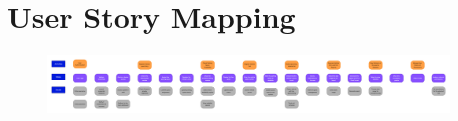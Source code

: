 \section{User Story Mapping}

\begin{figure}[h!]
    \centering
    \includegraphics[width=0.95\textwidth]{user_stories/user-story-mapping.pdf}
    \label{fig:user-story-mapping}
\end{figure}
